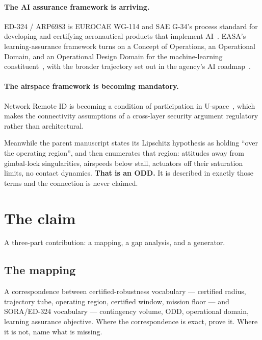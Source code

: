 \documentclass[11pt,a4paper]{article}
\begin{document}
\paragraph{The AI assurance framework is arriving.}
ED-324 / ARP6983 is EUROCAE WG-114 and SAE G-34's process standard for
developing and certifying aeronautical products that implement
AI~\cite{ed324,eurocae_wg114}. EASA's learning-assurance framework turns on a
Concept of Operations, an Operational Domain, and an Operational Design Domain
for the machine-learning constituent~\cite{easa_mleap,easa_ai_concept2}, with
the broader trajectory set out in the agency's AI
roadmap~\cite{easa_ai_roadmap2}.

\paragraph{The airspace framework is becoming mandatory.}
Network Remote ID is becoming a condition of participation in
U-space~\cite{easa_uspace2021,easa_remoteid_2026}, which makes the connectivity
assumptions of a cross-layer security argument regulatory rather than
architectural.

Meanwhile the parent manuscript states its Lipschitz hypothesis as holding
``over the operating region'', and then enumerates that region: attitudes away
from gimbal-lock singularities, airspeeds below stall, actuators off their
saturation limits, no contact dynamics. \textbf{That is an ODD.} It is described
in exactly those terms and the connection is never claimed.

\section{The claim}
A three-part contribution: a mapping, a gap analysis, and a generator.

\subsection{The mapping}
A correspondence between certified-robustness vocabulary --- certified radius,
trajectory tube, operating region, certified window, mission floor --- and
SORA/ED-324 vocabulary --- contingency volume, ODD, operational domain, learning
assurance objective. Where the correspondence is exact, prove it. Where it is
not, name what is missing.
\end{document}
